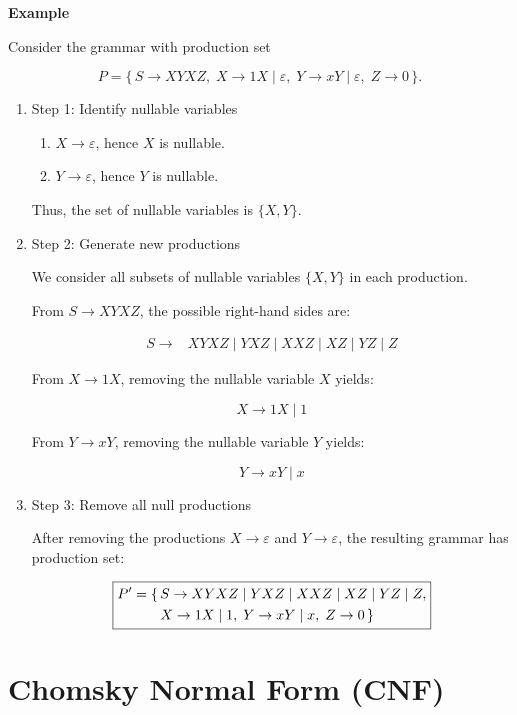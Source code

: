 \documentclass[12pt,a4paper,openany]{article}
\begin{document}
\textbf{Example}

Consider the grammar with production set

\[
P = \{\, S \to XYXZ,\; X \to 1X \mid \varepsilon,\; Y \to xY \mid \varepsilon,\; Z \to 0 \,\}.
\]

\begin{enumerate}

\item Step 1: Identify nullable variables

\begin{enumerate}
    \item $X \to \varepsilon$, hence $X$ is nullable.
    \item $Y \to \varepsilon$, hence $Y$ is nullable.
\end{enumerate}

Thus, the set of nullable variables is $\{X, Y\}$.

\item Step 2: Generate new productions

We consider all subsets of nullable variables $\{X,Y\}$ in each production.


From $S \to XYXZ$, the possible right-hand sides are:

\[
\begin{aligned}
S \to {} &XYXZ \mid YXZ \mid XXZ \mid XZ \mid YZ \mid Z
\end{aligned}
\]



From $X \to 1X$, removing the nullable variable $X$ yields:

\[
X \to 1X \mid 1
\]


From $Y \to xY$, removing the nullable variable $Y$ yields:

\[
Y \to xY \mid x
\]

\item Step 3: Remove all null productions

After removing the productions $X \to \varepsilon$ and $Y \to \varepsilon$, the resulting
grammar has production set:

\[
\fbox{$
\begin{aligned}
P' = \{\, 
&S \to XYXZ \mid YXZ \mid XXZ \mid XZ \mid YZ \mid Z, \\
&X \to 1X \mid 1,\;
Y \to xY \mid x,\;
Z \to 0
\,\}
\end{aligned}
$}
\]

\end{enumerate}

\section{Chomsky Normal Form (CNF)}
\end{document}
